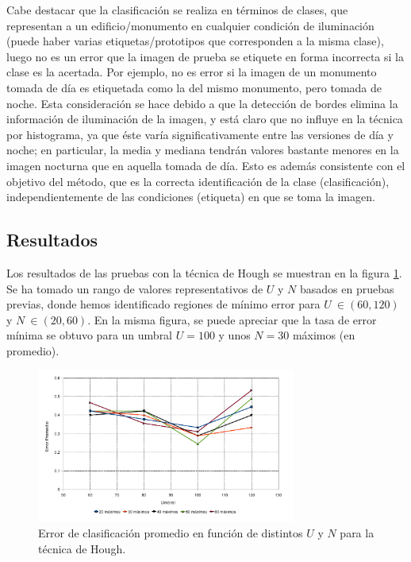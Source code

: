 \documentclass[conference,a4paper,10pt,oneside,final]{tfmpd}
\begin{document}
Cabe destacar que la clasificación se realiza en términos de clases, que
representan a un edificio/monumento en cualquier condición de iluminación
(puede haber varias etiquetas/prototipos que corresponden a la misma clase),
luego no es un error que la imagen de prueba se etiquete en forma incorrecta
si la clase es la acertada.
Por ejemplo, no es error si la imagen de un monumento tomada de día es
etiquetada como la del mismo monumento, pero tomada de noche.
Esta consideración se hace debido a que la detección de bordes elimina la
información de iluminación de la imagen, y está claro que no influye
en la técnica por histograma, ya que éste varía significativamente
entre las versiones de día y noche; en particular, la media y mediana tendrán
valores bastante menores en la imagen nocturna que en aquella tomada de día.
Esto es además consistente con el objetivo del método, que es la correcta
identificación de la clase (clasificación), independientemente de las
condiciones (etiqueta) en que se toma la imagen.
%
%
\subsection{Resultados}
Los resultados de las pruebas con {la técnica} de Hough se muestran en la figura
\ref{graficaerror}. Se ha tomado un rango de valores representativos de $U$
y $N$ basados en pruebas previas, donde hemos identificado regiones de mínimo
error para $U~\in(60,120)$ y $N~\in(20,60)$.
En la misma figura, se puede apreciar que la tasa de error mínima se obtuvo
para un umbral $U = 100$ y unos $N = 30$ máximos (en promedio).

\begin{figure}
\begin{center}
\includegraphics[width=8.5cm]{../diagramas/estadistica_noche_iguales}
\end{center}
\caption{Error de clasificación promedio en función de distintos $U$ y $N$ para
{la técnica} de Hough.}
\label{graficaerror}
\end{figure}
\end{document}
